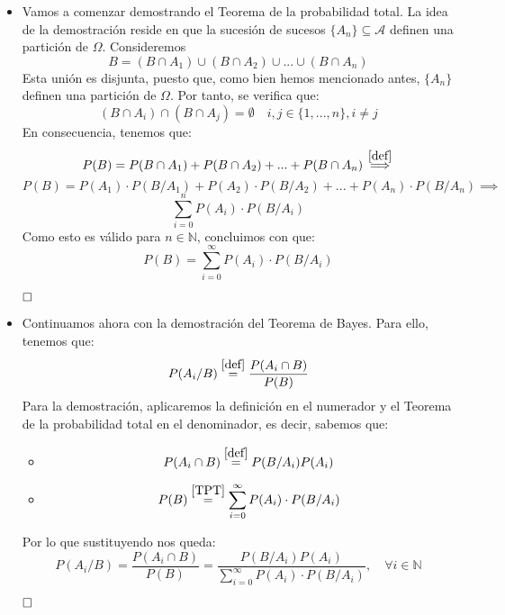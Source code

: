 \documentclass[a4paper, 12pt]{article}
\theoremstyle{plain}
\theoremstyle{definition}
\theoremstyle{remark}
\begin{document}
	\begin{itemize}
		\item Vamos a comenzar demostrando el Teorema de la probabilidad total. La idea de la demostración reside en que la sucesión de sucesos $\{A_n\}\subseteq \mathcal{A}$ definen una partición de $\Omega$. Consideremos
			\[B=(B\cap A_1)\cup (B\cap A_2)\cup ... \cup (B\cap A_n)\]
		Esta unión es disjunta, puesto que, como bien hemos mencionado antes, $\{A_n\}$ definen una partición de $\Omega$. Por tanto, se verifica que:
			\[(B\cap A_i)\cap (B\cap A_j)=\emptyset \quad i,j\in \{1,...,n\},i\not=j\]
		En consecuencia, tenemos que:
			\[P(B)=P(B\cap A_1)+P(B\cap A_2)+...+P(B\cap A_n)\overset{\ref{def}}{\implies}\]
			\[P(B)=P(A_1)\cdot P(B/A_1)+P(A_2)\cdot P(B/A_2)+...+P(A_n)\cdot P(B/A_n)\implies\]
			\[\sum_{i=0}^{n}P(A_i)\cdot P(B/A_i)\]
		Como esto es válido para $n\in \mathbb{N}$, concluimos con que:
			\[P(B)=\sum_{i=0}^{\infty}P(A_i)\cdot P(B/A_i)\]
			
		$\hfill\square$
		\item Continuamos ahora con la demostración del Teorema de Bayes. Para ello, tenemos que:
			\[P(A_i/B)\overset{\ref{def}}{=}\frac{P(A_i\cap B)}{P(B)}\]
		Para la demostración, aplicaremos la definición en el numerador y el Teorema de la probabilidad total en el denominador, es decir, sabemos que:
		\begin{itemize}
			\item \[P(A_i\cap B)\overset{\ref{def}}{=}P(B/A_i)P(A_i)\]
			\item \[P(B)\overset{\ref{TPT}}{=}\sum_{i=0}^{\infty}P(A_i)\cdot P(B/A_i)\]
		\end{itemize}
		Por lo que sustituyendo nos queda:
			\[P(A_i/B)=\frac{P(A_i\cap B)}{P(B)}=\frac{P(B/A_i)P(A_i)}{\sum_{i=0}^{\infty}P(A_i)\cdot P(B/A_i)}, \quad \forall i\in \mathbb{N}\]
			
		$\hfill\square$
	\end{itemize}
\end{document}
